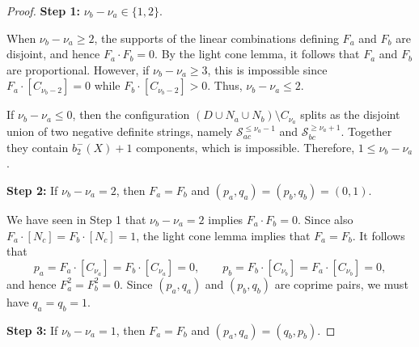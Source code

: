 \documentclass[11pt]{article}
\theoremstyle{definition}
\theoremstyle{remark}
\newcommand{\st}{\mathcal{S}}
\begin{document}
\begin{proof}
{\bf Step 1:} $\nu_b-\nu_a\in\{1,2\}$.

When $\nu_b-\nu_a\geq 2$, the supports of the linear combinations defining $F_a$ and $F_b$ are disjoint, and hence $F_a\cdot F_b=0$. By the light cone lemma, it follows that $F_a$ and $F_b$ are proportional. However, if $\nu_b-\nu_a\geq 3$, this is impossible since $F_a\cdot [C_{\nu_b-2}]=0$ while $ F_b\cdot [C_{\nu_b-2}]>0$. Thus, $\nu_b-\nu_a\leq 2$.

If $\nu_b-\nu_a\leq 0$, then the configuration $(D\cup N_a\cup N_b)\setminus C_{\nu_a}$ splits as the disjoint union of two negative definite strings, namely $\st_{ac}^{\leq \nu_a-1}$ and $\st_{bc}^{\geq \nu_a+1}$. Together they contain $b_2^-(X)+1$ components, which is impossible. Therefore, $1\leq \nu_b-\nu_a$.

\medskip
 {\bf Step 2:} If $\nu_b-\nu_a=2$, then $F_a=F_b$ and $(p_a,q_a)=(p_b,q_b)=(0,1)$.

 We have seen in Step 1 that $\nu_b-\nu_a=2$ implies $F_a\cdot F_b=0$. Since also $F_a\cdot [N_c]=F_b\cdot [N_c]=1$, the light cone lemma implies that $F_a=F_b$.
  It follows that
  \[
    p_a=F_a\cdot [C_{\nu_a}]=F_b\cdot [C_{\nu_a}]=0,
    \qquad
    p_b=F_b\cdot [C_{\nu_b}]=F_a\cdot [C_{\nu_b}]=0,
  \]
  and hence $F_a^2=F_b^2=0$. Since $(p_a,q_a)$ and $(p_b,q_b)$ are coprime pairs, we must have $q_a=q_b=1$.
  
\medskip
{\bf Step 3:} If $\nu_b-\nu_a=1$, then $F_a=F_b$ and $(p_a,q_a)=(q_b,p_b)$.


\end{proof}
\end{document}
